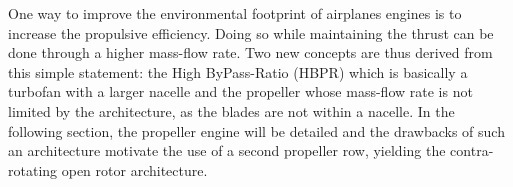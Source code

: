 One way to improve the environmental footprint of
airplanes engines is to increase the propulsive efficiency.
Doing so while maintaining the thrust can be done through
a higher mass-flow rate. Two new concepts are thus derived from
this simple statement: the High ByPass-Ratio (HBPR) which
is basically a turbofan with a larger nacelle and the
propeller whose mass-flow rate is not limited
by the architecture, as the blades are not within a nacelle.
In the following section, the propeller engine will be detailed
and the drawbacks of such an architecture motivate the use
of a second propeller row, yielding the contra-rotating open rotor
architecture.


